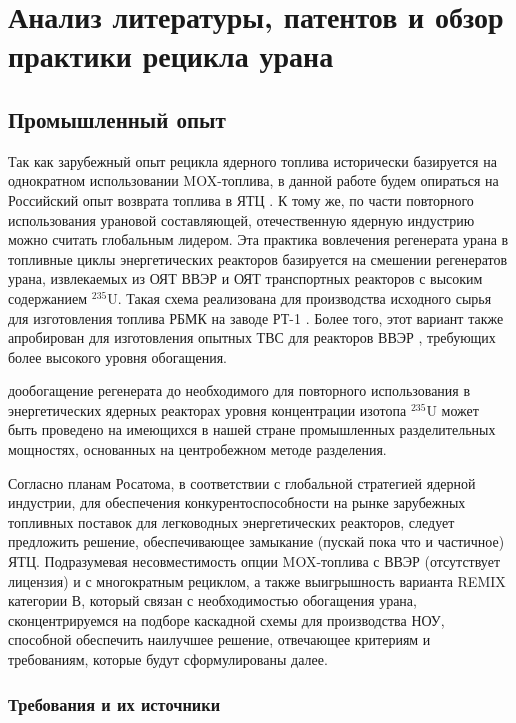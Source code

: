 \chapter{Анализ литературы, патентов и обзор практики рецикла урана}\label{ch:ch1}

\section{Промышленный опыт}\label{sec:ch1/sec1}
Так как зарубежный опыт рецикла ядерного топлива исторически базируется на однократном использовании MOX-топлива, в данной работе будем опираться на Российский опыт возврата топлива в ЯТЦ \cite{international2003iaea}. К тому же, по части повторного использования урановой составляющей, отечественную ядерную индустрию можно считать глобальным лидером.  Эта практика вовлечения регенерата урана в топливные циклы энергетических реакторов базируется на смешении регенератов урана, извлекаемых из ОЯТ ВВЭР и ОЯТ транспортных реакторов с высоким содержанием $^{235}$U. Такая схема реализована для производства исходного сырья для изготовления топлива РБМК на заводе РТ-1 \cite{volkVozvratUranaIz2010}. Более того, этот вариант также апробирован для изготовления опытных ТВС для реакторов ВВЭР \cite{proselkovAnalizVozmozhnostiIspolzovaniya2003}, требующих более высокого уровня обогащения.

дообогащение регенерата до необходимого для повторного использования в энергетических ядерных реакторах уровня концентрации изотопа $^{235}$U может быть проведено на имеющихся в нашей стране промышленных разделительных мощностях, основанных на центробежном методе разделения. 

Согласно планам Росатома, в соответствии с глобальной стратегией ядерной индустрии, для обеспечения конкурентоспособности на рынке зарубежных топливных поставок для легководных энергетических реакторов, следует предложить решение, обеспечивающее замыкание (пускай пока что и частичное) ЯТЦ. Подразумевая несовместимость опции MOX-топлива с ВВЭР (отсутствует лицензия) и с многократным рециклом, а также выигрышность варианта REMIX категории В, который связан с необходимостью обогащения урана, сконцентрируемся на подборе каскадной схемы для производства НОУ, способной обеспечить наилучшее решение, отвечающее критериям и требованиям, которые будут сформулированы далее.

\subsection{Требования и их источники}\label{sec:ch1/sec1.1}

